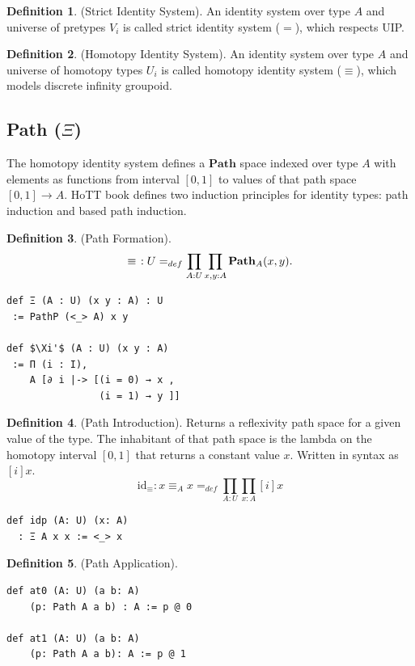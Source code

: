 \documentclass{article}
\theoremstyle{definition}
\newtheorem{definition}{Definition}
\begin{document}
\begin{definition} (Strict Identity System).
An identity system over type $A$ and universe
of pretypes $V_i$ is called strict identity system ($=$), which respects UIP.
\end{definition}

\begin{definition} (Homotopy Identity System).
An identity system over type $A$ and universe of homotopy
types $U_i$ is called homotopy identity system ($\equiv$),
which models discrete infinity groupoid.
\end{definition}

\newpage
\subsection{Path ($\Xi$)}
The homotopy identity system defines a $\mathbf{Path}$
space indexed over type $A$
with elements as functions from interval $[0,1]$ to values
of that path space $[0,1] \rightarrow A$. HoTT book
defines two induction principles for identity types:
path induction and based path induction.

\begin{definition} (Path Formation).
$$
  \equiv\hspace{0.4em}: U =_{def} \prod_{A:U}\prod_{x,y:A} \mathbf{Path}_A(x,y).
$$
\begin{lstlisting}[mathescape=true]
def Ξ (A : U) (x y : A) : U
 := PathP (<_> A) x y

def $\Xi'$ (A : U) (x y : A)
 := Π (i : I),
    A [∂ i |-> [(i = 0) → x ,
                (i = 1) → y ]]
\end{lstlisting}
\end{definition}

\begin{definition} (Path Introduction).
Returns a reflexivity path space for a given value of the type.
The inhabitant of that path space is the lambda on the homotopy
interval $[0,1]$ that returns a constant value $x$. Written in
syntax as $[i]x$.
$$
  \mathrm{id_\equiv} : x \equiv_A x =_{def} \prod_{A:U}\prod_{x:A} [i] x
$$
\begin{lstlisting}[mathescape=true]
def idp (A: U) (x: A)
  : Ξ A x x := <_> x
\end{lstlisting}
\end{definition}

\begin{definition} (Path Application).
\begin{lstlisting}[mathescape=true]
def at0 (A: U) (a b: A)
    (p: Path A a b) : A := p @ 0

def at1 (A: U) (a b: A)
    (p: Path A a b): A := p @ 1
\end{lstlisting}
\end{definition}
\end{document}
